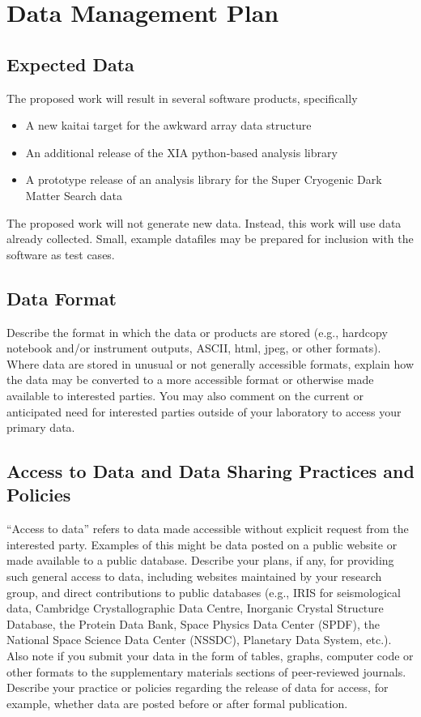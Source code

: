 \documentclass[11pt]{article}
\begin{document}

\section*{Data Management Plan}

\subsection{Expected Data}

The proposed work will result in several software products, specifically

\begin{itemize}
    \item A new kaitai target for the awkward array data structure
    \item An additional release of the XIA python-based analysis library
    \item A prototype release of an analysis library for the Super Cryogenic Dark Matter Search data
\end{itemize}

The proposed work will not generate new data.  Instead, this work will use data already collected.  Small, example datafiles may be prepared for inclusion with the software as test cases.

\subsection{Data Format}

Describe the format in which the data or products are stored (e.g., hardcopy notebook and/or instrument outputs, ASCII, html, jpeg, or other formats). Where data are stored in unusual or not generally accessible formats, explain how the data may be converted to a more accessible format or otherwise made available to interested parties.  You may also comment on the current or anticipated need for interested parties outside of your laboratory to access your primary data.

\subsection{Access to Data and Data Sharing Practices and Policies}

“Access to data” refers to data made accessible without explicit request from the interested party. Examples of this might be data posted on a public website or made available to a public database. Describe your plans, if any, for providing such general access to data, including websites maintained by your research group, and direct contributions to public databases (e.g., IRIS for seismological data, Cambridge Crystallographic Data Centre, Inorganic Crystal Structure Database, the Protein Data Bank, Space Physics Data Center (SPDF), the National Space Science Data Center (NSSDC), Planetary Data System, etc.). Also note if you submit your data in the form of tables, graphs, computer code or other formats to the supplementary materials sections of peer-reviewed journals. Describe your practice or policies regarding the release of data for access, for example, whether data are posted before or after formal publication.
\end{document}
